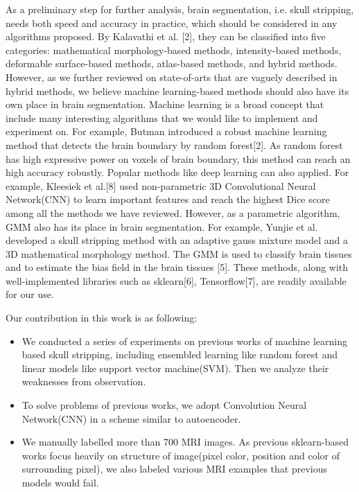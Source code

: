 \documentclass[conference]{IEEEtran}
\begin{document}
As a preliminary step for further analysis, brain segmentation, i.e. skull stripping, needs both speed and accuracy in practice, which should be considered in any algorithms proposed. By Kalavathi et al. [2], they can be classified into five categories: mathematical morphology-based methods, intensity-based methods, deformable surface-based methods, atlas-based methods, and hybrid methods. However, as we further reviewed on state-of-arts that are vaguely described in hybrid methods, we believe machine learning-based methods should also have its own place in brain segmentation. Machine learning is a broad concept that include many interesting algorithms that we would like to implement and experiment on. For example, Butman introduced a robust machine learning method that detects the brain boundary by random forest[2]. As random forest has high expressive power on voxels of brain boundary, this method can reach an high accuracy robustly. Popular methods like deep learning can also applied. For example, Kleesiek et al.[8] used non-parametric 3D Convolutional Neural Network(CNN) to learn important features and reach the highest Dice score among all the methods we have reviewed. However, as a parametric algorithm, GMM also has its place in brain segmentation. For example, Yunjie et al. developed a skull stripping method with an adaptive gauss mixture model and a 3D mathematical morphology method. The GMM is used to classify brain tissues and to estimate the bias field in the brain tissues [5]. These methods, along with well-implemented libraries such as sklearn[6], Tensorflow[7], are readily available for our use.

Our contribution in this work is as following:
\begin{itemize}
\item We conducted a series of experiments on previous works of machine learning based skull stripping, including ensembled learning like random forest and linear models like support vector machine(SVM). Then we analyze their weaknesses from observation. 
\item To solve problems of previous works, we adopt Convolution Neural Network(CNN) in a scheme similar to autoencoder. 
\item We manually labelled more than 700 MRI images. As previous sklearn-based works focus heavily on structure of image(pixel color, position and color of surrounding pixel), we also labeled various MRI examples that previous models would fail. 
\end{itemize}
\end{document}
